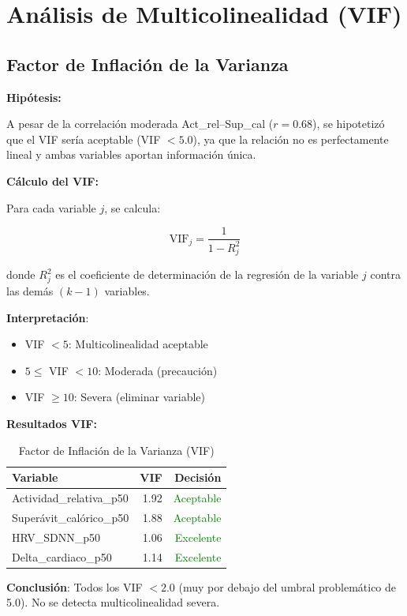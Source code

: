 \documentclass[12pt,letterpaper,twoside]{report}
\begin{document}
\section{Análisis de Multicolinealidad (VIF)}

\subsection{Factor de Inflación de la Varianza}

\begin{hipotesisbox}
\textbf{Hipótesis:}

A pesar de la correlación moderada Act\_rel--Sup\_cal ($r=0.68$), se hipotetizó que el VIF sería aceptable (VIF $< 5.0$), ya que la relación no es perfectamente lineal y ambas variables aportan información única.
\end{hipotesisbox}

\begin{estadisticobox}
\textbf{Cálculo del VIF:}

Para cada variable $j$, se calcula:

\begin{equation}
\text{VIF}_j = \frac{1}{1 - R^2_j}
\end{equation}

donde $R^2_j$ es el coeficiente de determinación de la regresión de la variable $j$ contra las demás $(k-1)$ variables.

\textbf{Interpretación}:
\begin{itemize}[noitemsep]
    \item VIF $< 5$: Multicolinealidad aceptable
    \item $5 \leq$ VIF $< 10$: Moderada (precaución)
    \item VIF $\geq 10$: Severa (eliminar variable)
\end{itemize}
\end{estadisticobox}

\begin{calculobox}
\textbf{Resultados VIF:}

\begin{table}[H]
\centering
\caption{Factor de Inflación de la Varianza (VIF)}
\label{tab:vif}
\begin{tabular}{@{}lrr@{}}
\toprule
\textbf{Variable} & \textbf{VIF} & \textbf{Decisión} \\
\midrule
Actividad\_relativa\_p50     & 1.92 & \textcolor{green}{Aceptable} \\
Superávit\_calórico\_p50     & 1.88 & \textcolor{green}{Aceptable} \\
HRV\_SDNN\_p50               & 1.06 & \textcolor{green}{Excelente} \\
Delta\_cardiaco\_p50         & 1.14 & \textcolor{green}{Excelente} \\
\bottomrule
\end{tabular}
\end{table}

\textbf{Conclusión}: Todos los VIF $< 2.0$ (muy por debajo del umbral problemático de 5.0). No se detecta multicolinealidad severa.
\end{calculobox}
\end{document}
